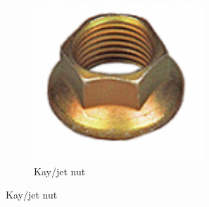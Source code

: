 \documentclass[10pt,letterpaper]{book}
\begin{document}
\begin{figure}[H]
\begin{subfigure}[b]{.24\linewidth}
			\includegraphics[width=0.7\textwidth]{imgs/kaynut.png}
			\caption{Kay/jet nut}
		\end{subfigure}
		

\end{figure}
\end{document}
